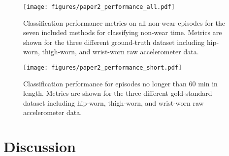 \documentclass[
  10pt,
]{scrbook}
\begin{document}
\begin{figure}

{\centering \texttt{[image: figures/paper2\_performance\_all.pdf]}

}

\caption{\label{fig-paper2_performance_all}Classification performance
metrics on all non-wear episodes for the seven included methods for
classifying non-wear time. Metrics are shown for the three different
ground-truth dataset including hip-worn, thigh-worn, and wrist-worn raw
accelerometer data.}

\end{figure}

\begin{figure}

{\centering \texttt{[image: figures/paper2\_performance\_short.pdf]}

}

\caption{\label{fig-paper2_performance_short}Classification performance
for episodes no longer than 60 min in length. Metrics are shown for the
three different gold-standard dataset including hip-worn, thigh-worn,
and wrist-worn raw accelerometer data.}

\end{figure}

\hypertarget{discussion-1}{%
\section{Discussion}\label{discussion-1}}
\end{document}
